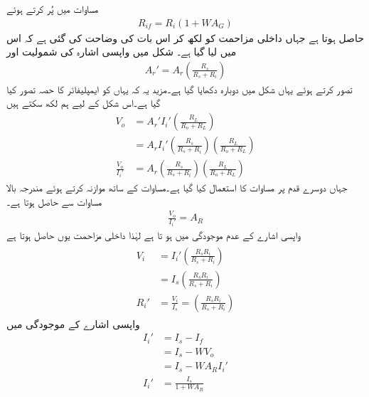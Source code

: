 مساوات  میں  پُر کرتے ہوئے
\begin{align}
R_{if}={R_i} \left({1+W A_G} \right )
\end{align}
حاصل ہوتا ہے جہاں داخلی مزاحمت کو  لکھ کر اس بات کی وضاحت کی گئی ہے کہ اس میں  لیا گیا ہے۔
شکل  میں واپسی اشارہ  کی شمولیت اور
\begin{align} \label{مساوات_واپسی_مزاحمت_نما_افزائش_بمع_اشارہ_مزاحمت}
A_r' = A_r \left( \frac{R_s}{R_s+R_i} \right )
\end{align}
تصور کرتے ہوئے یہاں شکل  میں دوبارہ دکھایا گیا ہے۔مزید یہ کہ یہاں  کو ایمپلیفائر کا حصہ تصور کیا گیا ہے۔اس شکل کے لیے ہم لکھ سکتے ہیں
\begin{align*}
V_o&=A_r' I_i' \left (\frac{R_L}{R_o+R_L} \right )\\
&=A_r  I_i' \left( \frac{R_s}{R_s+R_i} \right ) \left (\frac{R_L}{R_o+R_L} \right ) \\
\frac{V_o}{I_i'}&=A_r  \left( \frac{R_s}{R_s+R_i} \right ) \left (\frac{R_L}{R_o+R_L} \right )
\end{align*}
جہاں دوسرے قدم پر مساوات  کا استعمال کیا گیا ہے۔مساوات  کے ساتھ موازنہ  کرتے ہوئے مندرجہ بالا مساوات سے حاصل ہوتا ہے۔
\begin{align} \label{مساوات_واپسی_مزاحمت_نما_افزائش_ب}
\frac{V_o}{I_i'}=A_R
\end{align}
واپسی اشارے کے عدم موجودگی میں  ہو تا ہے لہٰذا  داخلی مزاحمت  یوں حاصل ہوتا ہے 
\begin{gather}
\begin{aligned}
V_i &=I_i' \left (\frac{R_s R_i}{R_s +R_i} \right ) \\
&=I_s \left (\frac{R_s R_i}{R_s +R_i} \right ) \\
R_i'&=\frac{V_i}{I_s}= \left (\frac{R_s R_i}{R_s +R_i} \right )
\end{aligned}
\end{gather}
واپسی اشارے کے موجودگی میں
\begin{align*}
I_i'&=I_s-I_f\\
&=I_s-W V_o \\
&=I_s-W A_R I_i'\\
I_i'&=\frac{I_s}{1+W A_R}
\end{align*}
